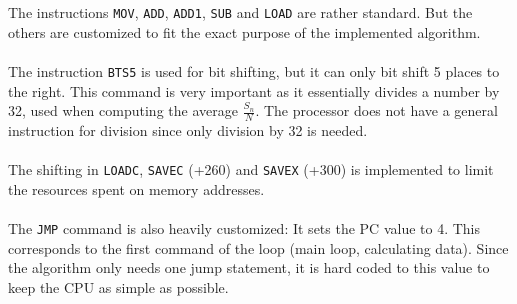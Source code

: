 The instructions \texttt{MOV}, \texttt{ADD}, \texttt{ADD1}, \texttt{SUB} and \texttt{LOAD} are rather standard. But the others are customized to fit the exact purpose of the implemented algorithm.\\
\\
The instruction \texttt{BTS5} is used for bit shifting, but it can only bit shift 5 places to the right. This command is very important as it essentially divides a number by 32, used when computing the average $\frac{S_n}{N}$. The processor does not have a general instruction for division since only division by 32 is needed. \\
\\
The shifting in \texttt{LOADC}, \texttt{SAVEC} (+260) and \texttt{SAVEX} (+300) is implemented to limit the resources spent on memory addresses.\\
\\
The \texttt{JMP} command is also heavily customized: It sets the PC value to 4. This corresponds to the first command of the loop (main loop, calculating data). Since the algorithm only needs one jump statement, it is hard coded to this value to keep the CPU as simple as possible.
